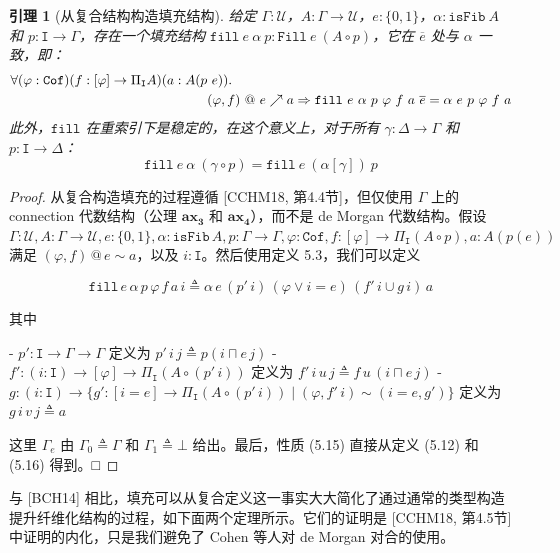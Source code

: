 \documentclass{ctexart}
\theoremstyle{plain}
\newtheorem{lemma}[theorem]{引理}
\theoremstyle{definition}
\theoremstyle{definition}
\theoremstyle{definition}
\theoremstyle{definition}
\newcommand\ttI{\mathtt{I}}
\newcommand{\Cof}{\mathtt{Cof}}
\newcommand{\ax}[1]{\mathbf{ax_{#1}}}
\numberwithin{equation}{section}
\begin{document}
\begin{lemma}[从复合结构构造填充结构]
给定 $\Gamma : \mathcal{U}$，$A : \Gamma \to \mathcal{U}$，$e : \{0, 1\}$，$\alpha : \mathtt{isFib}\ A$ 和 $p : \mathtt{I} \to \Gamma$，存在一个填充结构 $\mathtt{fill}\ e\ \alpha\ p : \mathtt{Fill}\ e\ (A \circ p)$，它在 $\overline{e}$ 处与 $\alpha$ 一致，即：
\begin{align}
\forall(\varphi : \Cof)(f : [\varphi] \to \Pi_\mathtt{I} A)(a : A(p&\ e)).\notag\\
&(\varphi, f) \ @\  e \nearrow a \Rightarrow \mathtt{fill}\ e\ \alpha\ p\ \varphi\ f\ a\ \overline{e} = \alpha\ e\ p\ \varphi\ f\ a
\end{align}
此外，$\mathtt{fill}$ 在重索引下是\textit{稳定的}，在这个意义上，对于所有 $\gamma : \Delta \to \Gamma$ 和 $p : \mathtt{I} \to \Delta$：
\begin{equation}
\mathtt{fill}\ e\ \alpha\ (\gamma \circ p) = \mathtt{fill}\ e\ (\alpha[\gamma])\ p
\end{equation}
\end{lemma}
\begin{proof}
  从复合构造填充的过程遵循 [CCHM18, 第4.4节]，但仅使用 $\Gamma$ 上的 connection 代数结构（公理 $\ax{3}$ 和 $\ax{4}$），而不是 de Morgan 代数结构。假设 $\Gamma : \mathcal{U}, A : \Gamma \to \mathcal{U}, e : \{0,1\}, \alpha : \mathtt{isFib} \, A, p : \Gamma \to \Gamma, \varphi : \mathtt{Cof}, f : [\varphi] \to \Pi_{\ttI} (A \circ p), a : A(p(e))$ 满足 $(\varphi, f) \,@\, e \sim a$，以及 $i : {\ttI}$。然后使用定义 5.3，我们可以定义

\[\mathtt{fill} \, e \, \alpha \, p \, \varphi \, f \, a \, i \triangleq \alpha \, e \, (p' \, i) \, (\varphi \lor i = e) \, (f' \, i \cup g \, i) \, a \tag{5.16}\]

其中

- $p' : {\ttI} \to \Gamma \to \Gamma$ 定义为 $p' \, i \, j \triangleq p(i \sqcap e \, j)$
- $f' : (i : {\ttI}) \to [\varphi] \to \Pi_{\ttI} (A \circ (p' \, i))$ 定义为 $f' \, i \, u \, j \triangleq f \, u \, (i \sqcap e \, j)$
- $g : (i : {\ttI}) \to \{g' : [i = e] \to \Pi_{\ttI} (A \circ (p' \, i)) \mid (\varphi, f' \, i) \sim (i = e, g')\}$ 定义为 $g \, i \, v \, j \triangleq a$

这里 $\Gamma_e$ 由 $\Gamma_0 \triangleq \Gamma$ 和 $\Gamma_1 \triangleq \bot$ 给出。最后，性质 (5.15) 直接从定义 (5.12) 和 (5.16) 得到。□
\end{proof}
与 [BCH14] 相比，填充可以从复合定义这一事实大大简化了通过通常的类型构造提升纤维化结构的过程，如下面两个定理所示。它们的证明是 [CCHM18, 第4.5节] 中证明的内化，只是我们避免了 Cohen 等人对 de Morgan 对合的使用。
\end{document}
